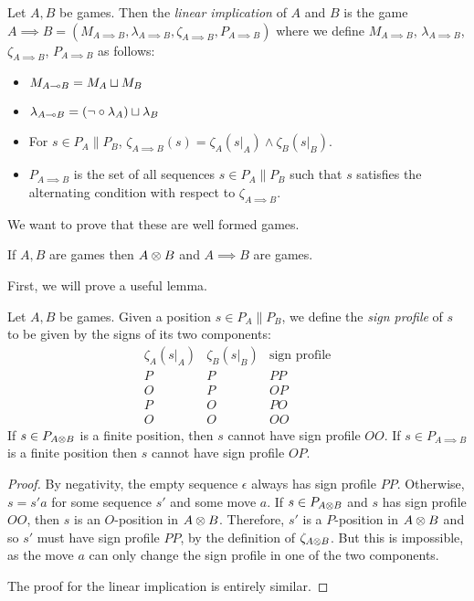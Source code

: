 \documentclass{article}
\begin{document}
\begin{definition}
  Let $A,B$ be games.  Then the \emph{linear implication} of $A$ and $B$ is the game $A\implies B=(M_{A\implies B}, \lambda_{A\implies B}, \zeta_{A\implies B}, P_{A\implies B})$ where we define $M_{A\implies B}$, $\lambda_{A\implies B}$, $\zeta_{A\implies B}$, $P_{A\implies B}$ as follows:
  \begin{itemize}
    \item $M_{A\multimap B} = M_A \sqcup M_B$
    \item $\lambda_{A\multimap B} = (\neg\circ\lambda_A) \sqcup \lambda_B$
    \item For $s\in P_A\|P_B$, $\zeta_{A\implies B}(s) = \zeta_A(s\vert_A) \wedge \zeta_B(s\vert_B)$.
    \item $P_{A\implies B}$ is the set of all sequences $s\in P_A\|P_B$ such that $s$ satisfies the alternating condition with respect to $\zeta_{A\implies B}$.  
  \end{itemize}
\end{definition}

We want to prove that these are well formed games.

\begin{proposition}\label{TensorImpliesWellFormed}
  If $A,B$ are games then $A\otimes B$ and $A\implies B$ are games.
\end{proposition}

First, we will prove a useful lemma.

\begin{lemma}\label{signProfilesLemma}
  Let $A,B$ be games.  Given a position $s\in P_A\|P_B$, we define the \emph{sign profile} of $s$ to be given by the signs of its two components:
  \[
    \begin{array}{cc|c}
      \zeta_A(s\vert_A) & \zeta_B(s\vert_B) & \textrm{sign profile} \\
      \hline
      P & P & PP \\
      O & P & OP \\
      P & O & PO \\
      O & O & OO
    \end{array}
    \]
  If $s\in P_{A\otimes B}$ is a finite position, then $s$ cannot have sign profile $OO$.  If $s\in P_{A\implies B}$ is a finite position then $s$ cannot have sign profile $OP$.  
  \begin{proof}
    By negativity, the empty sequence $\epsilon$ always has sign profile $PP$.  Otherwise, $s=s'a$ for some sequence $s'$ and some move $a$.  If $s\in P_{A\otimes B}$ and $s$ has sign profile $OO$, then $s$ is an $O$-position in $A\otimes B$.  Therefore, $s'$ is a $P$-position in $A\otimes B$ and so $s'$ must have sign profile $PP$, by the definition of $\zeta_{A\otimes B}$.  But this is impossible, as the move $a$ can only change the sign profile in one of the two components.  

    The proof for the linear implication is entirely similar.
  \end{proof}
\end{lemma}
\end{document}
